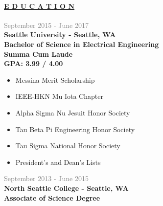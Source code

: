 \documentclass[letterpage]{article}
\begin{document}
\vspace*{20px}\\ %
\begin{minipage}[t]{0.424\linewidth}
\vspace{0pt}

\textbf{\fontsize{14px}{1px}\selectfont
  \ul{E D U C A T I O N}
}\\
\vspace{5px}\\
\textcolor{gray}{September 2015 - June 2017}\\
\textbf{\textsf{Seattle University - Seattle, WA}}\\
\textbf{Bachelor of Science in Electrical Engineering}\\
\textbf{Summa Cum Laude}\\
\textbf{GPA: 3.99 / 4.00}
\begin{itemize}[leftmargin=*,labelindent=5mm,labelsep=7mm]
\item
  Messina Merit Scholarship
\item
  IEEE-HKN Mu Iota Chapter
  {}
\item
  Alpha Sigma Nu Jesuit Honor Society
  {}
\item
  Tau Beta Pi Engineering Honor Society
\item
  Tau Sigma National Honor Society
\item
  President's and Dean's Lists
  {}
\end{itemize}
\vspace{7px}

\textcolor{gray}{September 2013 - June 2015}\\
\textbf{\textsf{North Seattle College - Seattle, WA}}\\
\textbf{Associate of Science Degree }


\end{minipage}
\end{document}
